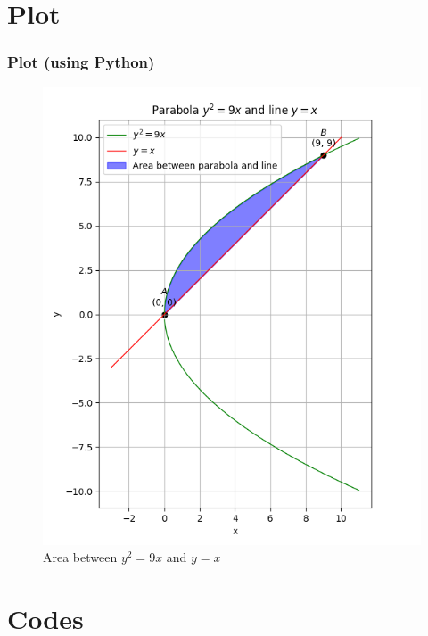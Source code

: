 \documentclass{beamer}
\theoremstyle{remark}
\numberwithin{equation}{section}
\begin{document}
\section{Plot}
\begin{frame}
  \frametitle{Plot (using Python)}
  \begin{figure}[htbp]
    \centering
    \includegraphics[width=0.5\framewidth]{figs/fig.png}
    \caption{Area between $y^2 = 9x$ and $y=x$}
  \end{figure}
\end{frame}

\section{Codes}
\end{document}
